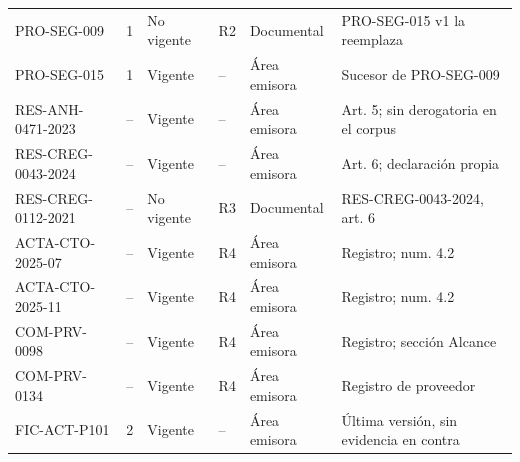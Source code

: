 \begin{longtable}{L{3.3cm} L{1.2cm} L{1.5cm} L{0.9cm} L{1.7cm} L{5.8cm}}
  PRO-SEG-009 & 1 & No vigente & R2 & Documental & PRO-SEG-015 v1 la reemplaza\\
  PRO-SEG-015 & 1 & Vigente & -- & Área emisora & Sucesor de PRO-SEG-009\\
  RES-ANH-0471-2023 & -- & Vigente & -- & Área emisora & Art. 5; sin derogatoria en el corpus\\
  RES-CREG-0043-2024 & -- & Vigente & -- & Área emisora & Art. 6; declaración propia\\
  RES-CREG-0112-2021 & -- & No vigente & R3 & Documental & RES-CREG-0043-2024, art. 6\\
  ACTA-CTO-2025-07 & -- & Vigente & R4 & Área emisora & Registro; num. 4.2\\
  ACTA-CTO-2025-11 & -- & Vigente & R4 & Área emisora & Registro; num. 4.2\\
  COM-PRV-0098 & -- & Vigente & R4 & Área emisora & Registro; sección Alcance\\
  COM-PRV-0134 & -- & Vigente & R4 & Área emisora & Registro de proveedor\\
  FIC-ACT-P101 & 2 & Vigente & -- & Área emisora & Última versión, sin evidencia en contra\\
\end{longtable}
